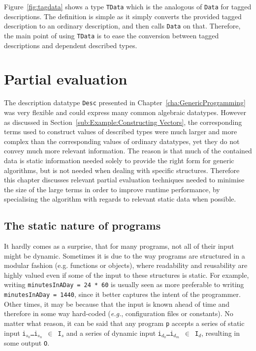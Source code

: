 \documentclass{ituthesis}
\newcommand{\tttype}[1]{\textcolor{type-color}{\texttt{#1}}}
\newcommand{\ttdec}[1]{\textcolor{declared-var-color}{\texttt{#1}}}
\newcommand{\ttvar}[1]{\textcolor{local-var-color}{\texttt{#1}}}
\newcommand{\ttliteral}[1]{\textcolor{literal-color}{\texttt{#1}}}
\theoremstyle{break}
\begin{document}
Figure~\ref{fig:tagdata} shows a type \ttdec{TData} which is the analogous of \tttype{Data} for tagged descriptions.
The definition is simple as it simply converts the provided tagged description to an ordinary description, and then calls \tttype{Data} on that.
Therefore, the main point of using \ttdec{TData} is to ease the conversion between tagged descriptions and dependent described types.



\chapter{Partial evaluation}
\label{cha:PartialEvaluation}

The description datatype \tttype{Desc} presented in Chapter~\ref{cha:GenericProgramming} was very flexible and could express many common algebraic datatypes.
However as discussed in Section~\ref{sub:Example:Constructing Vectors}, the corresponding terms used to construct values of described types were much larger and more complex than the corresponding values of ordinary datatypes, yet they do not convey much more relevant information.
The reason is that much of the contained data is static information needed solely to provide the right form for generic algorithms, but is not needed when dealing with specific structures.
Therefore this chapter discusses relevant partial evaluation techniques needed to minimise the size of the large terms in order to improve runtime performance, by specialising the algorithm with regards to relevant static data when possible.

\section{The static nature of programs}
\label{sec:Thestaticnatureofprograms}
It hardly comes as a surprise, that for many programs, not all of their input might be dynamic.
Sometimes it is due to the way programs are structured in a modular fashion (e.g. functions or objects), where readability and reusability are highly valued even if some of the input to these structures is static.
For example, writing \ttdec{minutesInADay}~\texttt{=}~\ttliteral{24}~\texttt{*}~\ttliteral{60} is usually seen as more preferable to writing \ttdec{minutesInADay}~\texttt{=}~\ttliteral{1440}, since
it better captures the intent of the programmer.
Other times, it may be because that the input is known ahead of time and therefore in some way hard-coded (\textit{e.g.}, configuration files or constants).
No matter what reason, it can be said that any program \ttdec{p} accepts a series of static input \ttvar{i$_{s_0}$}\texttt{\ldots}\ttvar{i$_{s_n}$}~\texttt{$\in$}~\ttvar{I$_{s}$} and a series of dynamic input \ttvar{i$_{d_0}$}\texttt{\ldots}\ttvar{i$_{d_m}$}~\texttt{$\in$}~\ttvar{I$_{d}$}, resulting in some output \ttvar{O}.
\end{document}
